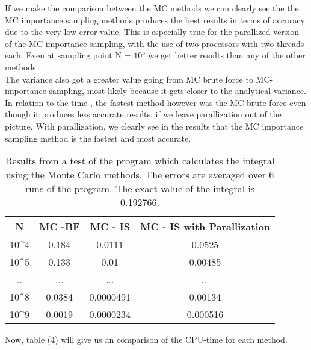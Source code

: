 \documentclass{article}
\begin{document}
        If we make the comparison between the MC methods we can clearly see the the MC importance sampling methods produces the best results in terms of accuracy due to the very low error value. This is especially true for the parallized version of the MC importance sampling, with the use of two processors with two threads each.   Even at sampling point N = $10^5$ we get better results than any of the other methods.  \\
        
        The variance also got a greater value going from MC brute force to MC- importance sampling, most likely because it gets closer to the analytical variance. In relation to the time , the fastest method however was the MC  brute force even though it produces less accurate results, if we leave parallization out of the picture. With parallization, we clearly see in the results that the MC importance sampling method is the fastest and most accurate. \\

		\begin{table}[h]
			\centering
			\caption{Results from a test of the program which calculates the integral using the Monte Carlo methods. The errors are averaged over 6 runs of the program. The exact value of the integral is 0.192766.}
			\label{table: results brute force MC}
			\begin{tabular}{|c|c|c|c|}
\hline
\textbf{N} 	&	\textbf{MC -BF}	&	\textbf{MC - IS }	&	\textbf{MC - IS with Parallization} \\ \hline 
10^4 	&	0.184	&	0.0111			&	0.0525	\\ \hline
10^5 	&	0.133	&	0.01			&	0.00485	\\ \hline
.. 	&	...	&	...			&	...	                \\ \hline
10^8 	&	0.0384	&	0.0000491			&	0.00134 	\\ \hline
10^9 	&	0.0019	&	0.0000234		&	0.000516	\\ \hline
			\end{tabular}
		\end{table}
Now, table (4) will give us an comparison of the CPU-time for each method.
\end{document}
